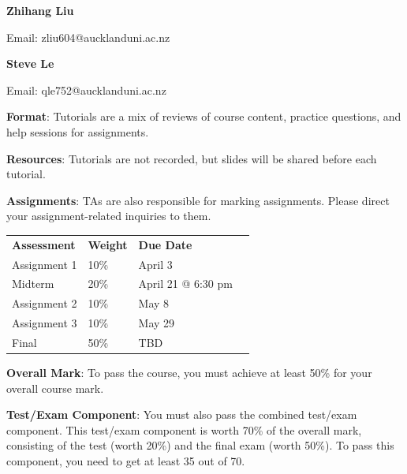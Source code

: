 \begin{slide}


	\textbf{Zhihang Liu}

	Email: zliu604@aucklanduni.ac.nz

	\medskip

	\textbf{Steve Le}

	Email: qle752@aucklanduni.ac.nz
	
	\bigskip
	
	\textbf{Format}: Tutorials are a mix of reviews of course content, practice questions, and help sessions for assignments.

	\medskip

	\textbf{Resources}: Tutorials are not recorded, but slides will be shared before each tutorial.

	\medskip

	\textbf{Assignments}: TAs are also responsible for marking assignments. Please direct your assignment-related inquiries to them.

\end{slide}

\begin{slide}

    
    \begin{center}
        \begin{tabular}{  l l l l  } 
          \textbf{Assessment} & \textbf{Weight} & \textbf{Due Date} \\ 
          Assignment 1 & 10\% & April 3 \\ 
          Midterm & 20\% & April 21 @ 6:30 pm \\ 
          Assignment 2 & 10\% & May 8 \\ 
          Assignment 3 & 10\% & May 29  \\ 
          Final & 50\% & TBD \\ 
        \end{tabular}
    \end{center}
	
	\medskip
		
	\textbf{Overall Mark}: To pass the course, you must achieve at least 50\% for your overall course mark.
	
	\medskip
	
	\textbf{Test/Exam Component}: You must also pass the combined test/exam component. This test/exam component is worth 70\% of the overall mark, consisting of the test (worth 20\%) and the final exam (worth 50\%). To pass this component, you need to get at least 35 out of 70.    
		
\end{slide}

